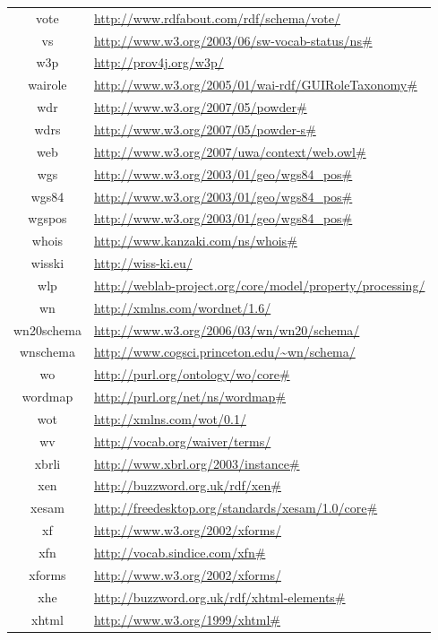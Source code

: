 \documentclass{article}
\begin{document}
\begin{longtable}{ c | p{8cm} }
		vote & \url{http://www.rdfabout.com/rdf/schema/vote/} \\
		vs & \url{http://www.w3.org/2003/06/sw-vocab-status/ns#} \\
		w3p & \url{http://prov4j.org/w3p/} \\
		wairole & \url{http://www.w3.org/2005/01/wai-rdf/GUIRoleTaxonomy#} \\
		wdr & \url{http://www.w3.org/2007/05/powder#} \\
		wdrs & \url{http://www.w3.org/2007/05/powder-s#} \\
		web & \url{http://www.w3.org/2007/uwa/context/web.owl#} \\
		wgs & \url{http://www.w3.org/2003/01/geo/wgs84_pos#} \\
		wgs84 & \url{http://www.w3.org/2003/01/geo/wgs84_pos#} \\
		wgspos & \url{http://www.w3.org/2003/01/geo/wgs84_pos#} \\
		whois & \url{http://www.kanzaki.com/ns/whois#} \\
		wisski & \url{http://wiss-ki.eu/} \\
		wlp & \url{http://weblab-project.org/core/model/property/processing/} \\
		wn & \url{http://xmlns.com/wordnet/1.6/} \\
		wn20schema & \url{http://www.w3.org/2006/03/wn/wn20/schema/} \\
		wnschema & \url{http://www.cogsci.princeton.edu/~wn/schema/} \\
		wo & \url{http://purl.org/ontology/wo/core#} \\
		wordmap & \url{http://purl.org/net/ns/wordmap#} \\
		wot & \url{http://xmlns.com/wot/0.1/} \\
		wv & \url{http://vocab.org/waiver/terms/} \\
		xbrli & \url{http://www.xbrl.org/2003/instance#} \\
		xen & \url{http://buzzword.org.uk/rdf/xen#} \\
		xesam & \url{http://freedesktop.org/standards/xesam/1.0/core#} \\
		xf & \url{http://www.w3.org/2002/xforms/} \\
		xfn & \url{http://vocab.sindice.com/xfn#} \\
		xforms & \url{http://www.w3.org/2002/xforms/} \\
		xhe & \url{http://buzzword.org.uk/rdf/xhtml-elements#} \\
		xhtml & \url{http://www.w3.org/1999/xhtml#} \\

\end{longtable}
\end{document}
